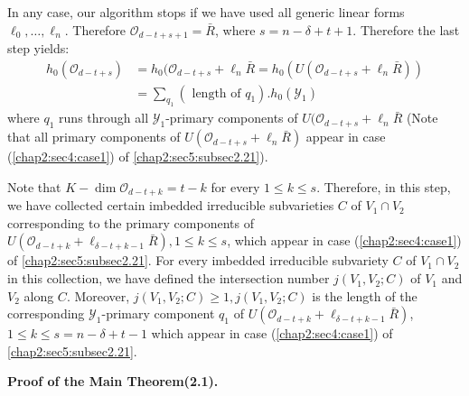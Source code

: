 In any case, our algorithm stops if we have used all generic linear
forms $\ell_0,\ldots,\ell_n$. Therefore $\mathscr{O}_{d-t+s+1} =
\bar{R}$, where $s = n - \delta+ t+1$. Therefore the last step yields: 
\begin{align*}
h_0(\mathscr{O}_{d-t+s}) &= h_0(\mathscr{O}_{d-t+s} + \ell_n \bar{R} =
h_0(U(\mathscr{O}_{d-t+s}+\ell_n\bar{R}))\\ 
&= \sum_{q_1} (\text{ length of } q_1).h_0(\mathscr{Y}_1)
\end{align*}
where $q_1$ runs through all $\mathscr{Y}_1$-primary components of
$U(\mathscr{O}_{d-t+s}+\ell_n\bar{R}$ (Note that all primary
components of $U(\mathscr{O}_{d-t+s}+\ell_n\bar{R})$ appear in case
(\ref{chap2:sec4:case1}) of \ref{chap2:sec5:subsec2.21}). 

\setcounter{remark}{23}
\begin{remark}\label{chap2:sec5:rem2.24}
  Note that $K-\dim \mathscr{O}_{d-t+k} = t-k$ for every $1\leq k \leq
  s$. Therefore, in this step, we have collected certain imbedded
  irreducible subvarieties $C$ of $V_1\cap V_2$ corresponding to the
  primary components of
  $U(\mathscr{O}_{d-t+k}+\ell_{\delta-t+k-1}\bar{R}),1\leq k \leq s$,
  which appear in case (\ref{chap2:sec4:case1}) of
  \ref{chap2:sec5:subsec2.21}. For every imbedded irreducible 
  subvariety $C$ of $V_1 \cap V_2$ in this collection, we have defined
  the intersection number $j(V_1,V_2;C)$ of $V_1$ and $V_2$ along
  $C$. Moreover, $j(V_1,V_2;C)\geq 1,j(V_1,V_2;C)$ is the length of
  the corresponding $\mathscr{Y}_1$-primary component $q_1$ of
  $U(\mathscr{O}_{d-t+k}+\ell_{\delta-t+k-1}\bar{R})$, $1\leq k \leq s
  = n-\delta +t-1$ which appear in case (\ref{chap2:sec4:case1}) of
  \ref{chap2:sec5:subsec2.21}.  
\end{remark}

\noindent \textbf{Proof of the Main Theorem(2.1).}

